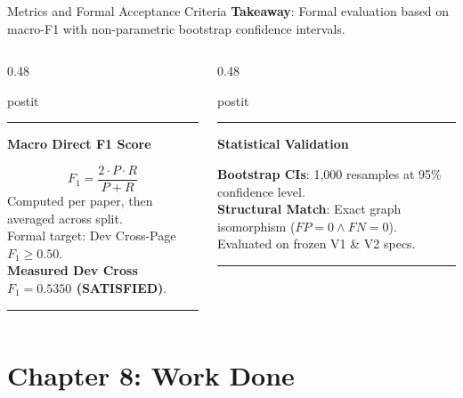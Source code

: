 \documentclass[aspectratio=43,10pt]{beamer}
\newcommand{\card}[4][\linewidth]{%
  \begin{beamercolorbox}[wd=#1,sep=0pt,rounded=false,shadow=false]{postit}%
    {\color{#3}\rule{\linewidth}{1.5pt}}\par
    \colorbox{slatebg}{%
      \begin{minipage}{\dimexpr#1-8pt\relax}%
        \vspace{1.5pt}%
        {\footnotesize\bfseries\color{#3}#2}\vspace{1.5pt}\par%
        {\scriptsize\color{darktext}#4}%
        \vspace{1.5pt}%
      \end{minipage}%
    }%
    \par{\color{bordergray}\rule{\linewidth}{0.6pt}}%
  \end{beamercolorbox}%
}
\begin{document}
\begin{frame}{Metrics and Formal Acceptance Criteria}
  \textbf{Takeaway}: Formal evaluation based on macro-F1 with non-parametric bootstrap confidence intervals.
  \vspace{0.15cm}
  \begin{columns}[T]
    \begin{column}{0.48\textwidth}
      \card{Macro Direct F1 Score}{navy}{
        \begin{equation*}
          F_1 = \frac{2 \cdot P \cdot R}{P + R}
        \end{equation*}
        \textbullet{} Computed per paper, then averaged across split.\\
        \textbullet{} Formal target: Dev Cross-Page $F_1 \ge 0.50$.\\
        \textbullet{} \textbf{Measured Dev Cross $F_1 = \mathbf{0.5350}$ (SATISFIED)}.
      }
    \end{column}
    \begin{column}{0.48\textwidth}
      \card{Statistical Validation}{teal}{
        \textbullet{} \textbf{Bootstrap CIs}: 1,000 resamples at 95\% confidence level.\\
        \textbullet{} \textbf{Structural Match}: Exact graph isomorphism ($FP=0 \land FN=0$).\\
        \textbullet{} Evaluated on frozen V1 \& V2 specs.
      }
    \end{column}
  \end{columns}
\end{frame}

\section{Chapter 8: Work Done}
\end{document}
